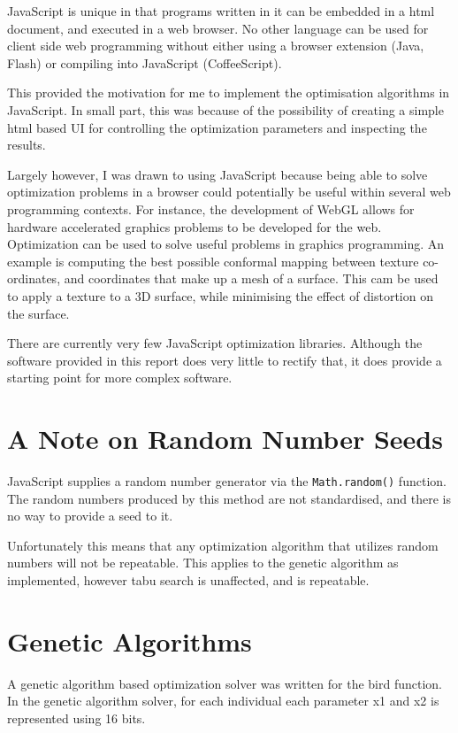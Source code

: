 \documentclass[a4paper,12pt]{article}
\begin{document}
 JavaScript is unique in that programs written in it can be embedded in a html document, and executed in a web browser. 
No other language can be used for client side web programming without either using a browser extension (Java, Flash) or compiling into JavaScript (CoffeeScript).

This provided the motivation for me to implement the optimisation algorithms in JavaScript. 
In small part, this was because of the possibility of creating a simple html based UI for controlling the optimization parameters and inspecting the results. 

Largely however, I was drawn to using JavaScript because being able to solve optimization problems in a browser could potentially be useful within several web programming contexts. 
For instance, the  development of WebGL allows for hardware accelerated graphics problems to be developed for the web. 
Optimization can be used to solve useful problems in graphics programming.
An example is computing the best possible conformal mapping between texture co-ordinates, and coordinates that make up a mesh of a surface. 
This cam be used to apply a texture to a 3D surface, while minimising the effect of distortion on the surface.

There are currently very few JavaScript optimization libraries. 
Although the software provided in this report does very little to rectify that, it does provide a starting point for more complex software. 

\section{A Note on Random Number Seeds}
JavaScript supplies a random number generator via the \texttt{Math.random()} function.
The random numbers produced by this method are not standardised, and there is no way to provide a seed to it.
 
Unfortunately this means that any optimization algorithm that utilizes random numbers will not be repeatable. 
This applies to the genetic algorithm as implemented, however tabu search is unaffected, and is repeatable.
\section{Genetic Algorithms}

A genetic algorithm based optimization solver was written for the bird function.
In the genetic algorithm solver, for each individual each parameter x1 and x2 is represented using 16 bits. 
 
\end{document}
